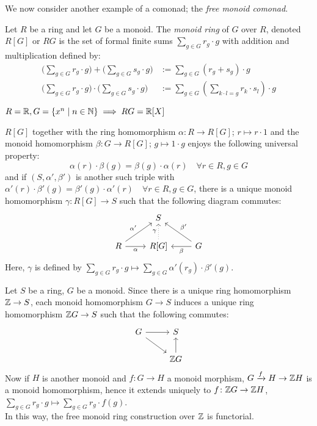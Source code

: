 We now consider another example of a comonad; the \textit{free monoid comonad}.
\begin{definition}
    Let $R$ be a ring and let $G$ be a monoid.
    The \textit{monoid ring} of $G$ over $R$, denoted $R[G]$ or $RG$
    is the set of formal finite sums $\sum_{g \in G}r_g \cdot g$
    with addition and multiplication defined by:
    \begin{align*}
        \big(\sum_{g \in G}r_g \cdot g \big) + \big(\sum_{g \in G}s_g \cdot g \big)
        & := \sum_{g \in G}(r_g + s_g)\cdot g \\
        \big(\sum_{g \in G}r_g \cdot g \big) \cdot \big(\sum_{g \in G}s_g \cdot g\big)
        & := \sum_{g \in G}(\sum_{k \cdot l = g} r_k \cdot s_l)\cdot g 
    \end{align*}
\end{definition}
\begin{example}
    $R = \mathbb{R}, G = \{x^n \mid n \in \mathbb{N}\} \implies RG = \mathbb{R}[X]$
\end{example}
\begin{remark} \label{rem: universal property of monoid ring}
$R[G]$ together with the ring homomorphism $\alpha \colon R \to R[G]$;
$r \mapsto r \cdot 1$ and the monoid homomorphism $\beta \colon 
G \to R[G]$; $g \mapsto 1 \cdot g$ 
enjoys the following universal property:
\[
  \alpha(r) \cdot \beta(g) = \beta(g) \cdot \alpha(r)
   \quad \forall r \in R, g \in G
\]
and if $(S,\alpha',\beta')$ is another such triple with
$\alpha'(r) \cdot \beta'(g) = \beta'(g) \cdot \alpha'(r)
   \quad \forall r \in R, g \in G$,
there is a unique monoid homomorphism $\gamma \colon R[G] \to S$
such that the following diagram commutes:
\[
    \begin{tikzcd}
        & S \\
        R \arrow[r,"\alpha"'] \arrow[ur,"\alpha'"] 
        & R[G] \arrow[u,"\gamma",dotted] 
        & G \arrow[l,"\beta"] \arrow[ul,"\beta'"']
    \end{tikzcd}
\]
Here, $\gamma$ is defined by 
$\sum_{g \in G}r_g \cdot g \mapsto \sum_{g \in G}\alpha'(r_g) \cdot \beta'(g)$.
\end{remark}
\begin{example}
    Let $S$ be a ring, $G$ be a monoid.
    Since there is a unique ring homomorphism $\mathbb{Z} \to S$, 
    each monoid homomorphism $G \to S$ induces a unique ring homomorphism
    $\mathbb{Z} G \to S$ such that the following commutes:
    \[
      \begin{tikzcd}
        G \arrow[r] \arrow[rd] 
        &S \\
        & \Z G \arrow[u]
      \end{tikzcd}
    \]
    Now if $H$ is another monoid and $f \colon G \to H$ a monoid morphism,
    $G \xrightarrow{f} H \to \mathbb{Z} H$ is a monoid homomorphism,
    hence it extends uniquely to $f \colon \mathbb{Z} G \to \mathbb{Z} H$,
    $\sum_{g \in G}r_g \cdot g \mapsto \sum_{g \in G}r_g \cdot f(g)$.\\ 
    In this way, the free monoid ring construction over $\mathbb{Z}$ is functorial.
\end{example}

